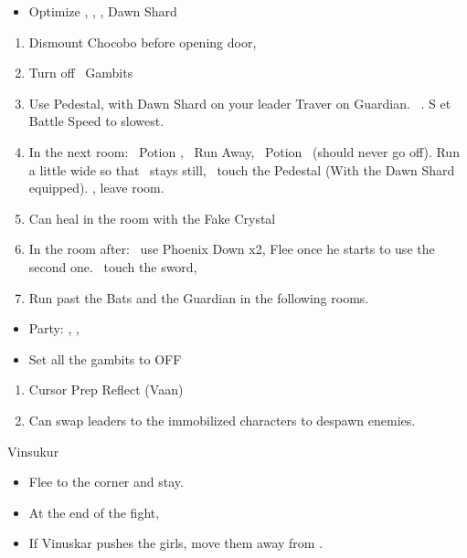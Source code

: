 \begin{equip}
\begin{itemize}
\item Optimize \vaan, \penelo, \ashe, \basch
\baschf Dawn Shard
\end{itemize}
\end{equip}
\begin{enumerate}[resume]
	\item Dismount Chocobo before opening door, \leader{\basch}
	\item Turn off \basch\ Gambits
	\item Use Pedestal, with Dawn Shard on your leader
	\vaanf Traver on Guardian. \basch\ . \travelercheck S et Battle Speed to slowest.
	\item In the next room: \vaan\ Potion \vaan, \basch\ Run Away, \vaan\ Potion \basch\ (should never go off). Run a little wide so that \vaan\ stays still, \basch\ touch the Pedestal (With the Dawn Shard equipped). \leader{\vaan}, leave room.
	\item Can heal in the room with the Fake Crystal
	\item In the room after: \basch\ use Phoenix Down x2, Flee once he starts to use the second one. \vaan\ touch the sword, \leader{\basch}
	\item Run past the Bats and the Guardian in the following rooms.
\end{enumerate}
\begin{menu}
\begin{itemize}
\item Party: \vaan, \ashe, \penelo
\battlefast
\end{itemize}
\end{menu}
\begin{gambit}
\begin{itemize}

\vaanf \textbf{OFF}
\item Set all the gambits to OFF %
\end{itemize}
\end{gambit}
\begin{enumerate}[resume]
	\ashef Blizzara \penelo
	\penelof Immobilize \ashe
	\item Cursor	Prep Reflect (Vaan)
	\item Can swap leaders to the immobilized characters to despawn enemies.
\end{enumerate}
\begin{battle}{Vinsukur}
	\begin{itemize}
		\vaanf Reflect \ashe, \penelo\ at the stairs.
		\item \GirlsGambitOn
		\vaanf Flee to the corner and stay.
		\item At the end of the fight, \GirlsGambitOff
		\item If Vinuskar pushes the girls, move them away from \vaan.
	\end{itemize}
\end{battle}

